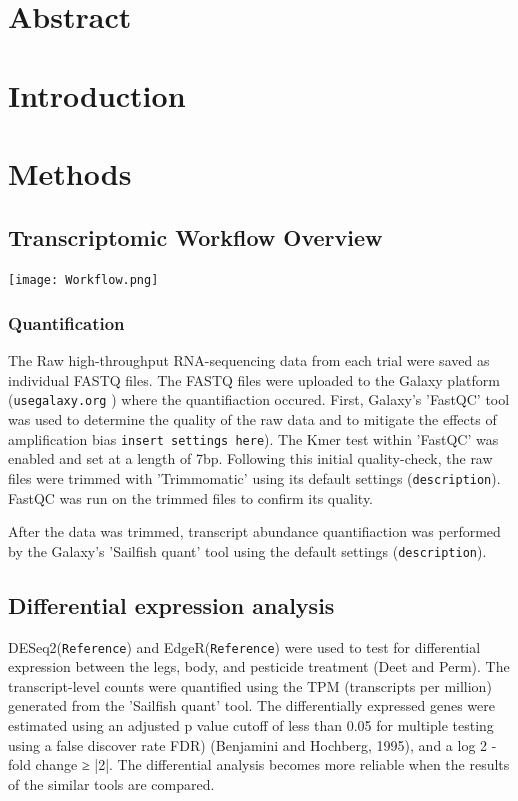 \documentclass[11pt]{article}
\author{David Lewis}
\date{\today}
\title{}
\begin{document}
\tableofcontents

\section{Abstract}
\label{sec:org673c52e}
\section{Introduction}
\label{sec:orga234600}
\section{Methods}
\label{sec:org461de2b}
\subsection{Transcriptomic Workflow Overview}
\label{sec:orgd2cd0a0}
\begin{center}
\texttt{[image: Workflow.png]}
\end{center}
\subsubsection{Quantification}
\label{sec:orgf0e41a5}
The Raw high-throughput RNA-sequencing data from each trial were saved as individual FASTQ files.
The FASTQ files were uploaded to the Galaxy platform (\texttt{usegalaxy.org} ) where the quantifiaction occured.
First, Galaxy's 'FastQC' tool was used to determine the quality of the raw data and to mitigate the effects of amplification bias \texttt{insert settings here}). The Kmer test within 'FastQC' was enabled and set at a length of 7bp.
Following this initial quality-check, the raw files were trimmed with 'Trimmomatic' using its default settings (\texttt{description}).
FastQC was run on the trimmed files to confirm its quality.

After the data was trimmed, transcript abundance quantifiaction was performed by the Galaxy's 'Sailfish quant' tool using the default settings (\texttt{description}).
\subsection{Differential expression analysis}
\label{sec:org71dd47e}
DESeq2(\texttt{Reference}) and EdgeR(\texttt{Reference}) were used to test for differential expression between the legs, body, and pesticide treatment (Deet and Perm). The transcript-level counts were quantified using the TPM (transcripts per million) generated from the 'Sailfish quant' tool. The differentially expressed genes were estimated using an adjusted p value cutoff of less than 0.05 for multiple testing using a false discover rate FDR)   (Benjamini   and   Hochberg,  1995),   and   a   log 2 -fold   change   ≥   |2|.
The differential analysis becomes more reliable when the results of the similar tools are compared.
\end{document}
